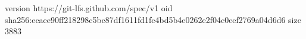 version https://git-lfs.github.com/spec/v1
oid sha256:ecaee90ff218298c5bc87df1611fd1fc4bd5b4e0262e2f04c0eef2769a04d6d6
size 3883
